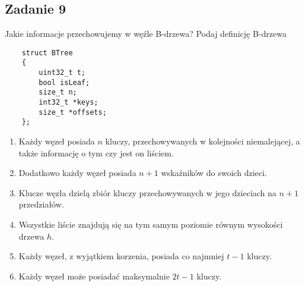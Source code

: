 \documentclass{article}
\begin{document}
\subsection*{Zadanie 9}
Jakie informacje przechowujemy w węźle B-drzewa? Podaj definicję B-drzewa
\begin{lstlisting}
    struct BTree
    {
        uint32_t t;
        bool isLeaf;
        size_t n;
        int32_t *keys;
        size_t *offsets;
    };
\end{lstlisting}
\begin{enumerate}
    \item Każdy węzeł posiada $n$ kluczy, przechowywanych w kolejności niemalejącej, a także informację o tym czy jest
          on liściem.
    \item Dodatkowo każdy węzeł posiada $n+1$ wskaźników do swoich dzieci.
    \item Klucze węzła dzielą zbiór kluczy przechowywanych w jego dzieciach na $n+1$ przedziałów.
    \item Wszystkie liście znajdują się na tym samym poziomie równym wysokości drzewa $h$.
    \item Każdy węzeł, z wyjątkiem korzenia, posiada co najmniej $t-1$ kluczy.
    \item Każdy węzeł może posiadać maksymalnie $2t-1$ kluczy.
\end{enumerate}
\end{document}
